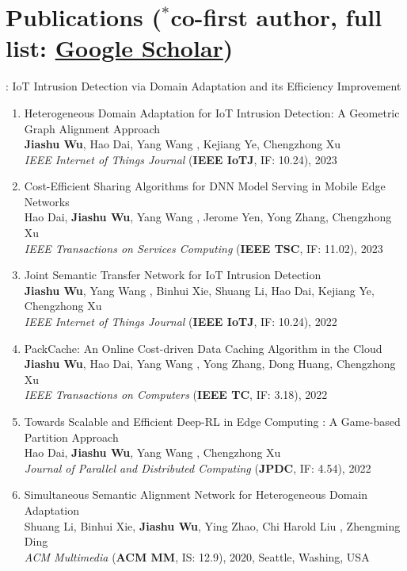 \documentclass[letterpaper,11pt]{article}
\newcommand{\RNum}[1]{\uppercase\expandafter{\romannumeral #1\relax}}
\begin{document}
\section{Publications ($^*$co-first author, full list: \href{https://scholar.google.com/citations?user=wGgUbQkAAAAJ}{Google Scholar})}

\RNum{1}: IoT Intrusion Detection via Domain Adaptation and its Efficiency Improvement
\begin{enumerate}
  \item Heterogeneous Domain Adaptation for IoT Intrusion Detection: A Geometric Graph Alignment Approach\\
  \textbf{Jiashu Wu}, Hao Dai, Yang Wang \Letter, Kejiang Ye, Chengzhong Xu\\
  \textit{IEEE Internet of Things Journal} (\textbf{IEEE IoTJ}, IF: 10.24), 2023

  \item Cost-Efficient Sharing Algorithms for DNN Model Serving in Mobile Edge Networks\\
  Hao Dai, \textbf{Jiashu Wu}, Yang Wang \Letter, Jerome Yen, Yong Zhang, Chengzhong Xu\\
  \textit{IEEE Transactions on Services Computing} (\textbf{IEEE TSC}, IF: 11.02), 2023

  \item Joint Semantic Transfer Network for IoT Intrusion Detection\\
  \textbf{Jiashu Wu}, Yang Wang \Letter, Binhui Xie, Shuang Li, Hao Dai, Kejiang Ye, Chengzhong Xu\\
  \textit{IEEE Internet of Things Journal} (\textbf{IEEE IoTJ}, IF: 10.24), 2022

  \item PackCache: An Online Cost-driven Data Caching Algorithm in the Cloud\\
  \textbf{Jiashu Wu}, Hao Dai, Yang Wang \Letter, Yong Zhang, Dong Huang, Chengzhong Xu\\
  \textit{IEEE Transactions on Computers} (\textbf{IEEE TC}, IF: 3.18), 2022

  \item Towards Scalable and Efficient Deep-RL in Edge Computing : A Game-based Partition Approach\\
  Hao Dai, \textbf{Jiashu Wu}, Yang Wang \Letter, Chengzhong Xu\\
  \textit{Journal of Parallel and Distributed Computing} (\textbf{JPDC}, IF: 4.54), 2022

  \item Simultaneous Semantic Alignment Network for Heterogeneous Domain Adaptation\\
  Shuang Li, Binhui Xie, \textbf{Jiashu Wu}, Ying Zhao, Chi Harold Liu \Letter, Zhengming Ding\\
  \textit{ACM Multimedia} (\textbf{ACM MM}, IS: 12.9), 2020, Seattle, Washing, USA


\end{enumerate}
\end{document}
